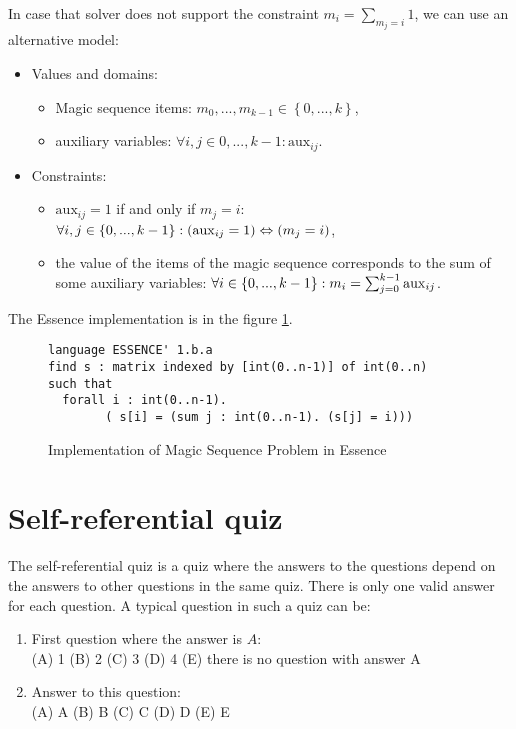 In case that solver does not support the constraint $m_i = \sum_{m_j = i}{1}$, we 
can use an alternative model: 

\begin{itemize}
	\item Values and domains:
  \begin{itemize} 
	 \item Magic sequence items: $m_0, ..., m_{k-1} \in \left\{0, ..., k\right\}$,
	 \item auxiliary variables: $\forall i,j \in {0, ..., k-1}: \mathrm{aux}_{ij}$.
	\end{itemize}
	\item Constraints:
	 \begin{itemize}
    \item $\mathrm{aux}_{ij} = 1$ if and only if $m_j = i$: $\forall i,j \in \left\{0, ..., k-1\right\}:\\ 
          (\mathrm{aux}_{ij} = 1) \Leftrightarrow (m_j = i)$,
	  \item the value of the items of the magic sequence corresponds to the sum of some auxiliary variables: 
          $\forall i \in \left\{0, ..., k-1\right\}:\\ m_i = \sum_{j=0}^{k-1}{\mathrm{aux}_{ij}}$.
    \end{itemize}
\end{itemize}
The Essence implementation is in the figure \ref{benchmark-essence:mseq}.

\begin{figure}
\caption{\label{benchmark-essence:mseq}Implementation of Magic Sequence Problem in Essence}
\begin{lstlisting}
language ESSENCE' 1.b.a
find s : matrix indexed by [int(0..n-1)] of int(0..n)
such that
  forall i : int(0..n-1).
        ( s[i] = (sum j : int(0..n-1). (s[j] = i)))
\end{lstlisting} 
\end{figure}

\section{Self-referential quiz}

The self-referential quiz is a quiz where the answers to the questions depend on the answers
to other questions in the same quiz. There is only one valid answer for each question.
A typical question in such a quiz can be: 

\begin{enumerate}
  \item First question where the answer is $A$: \\
    (A) 1 (B) 2 (C) 3 (D) 4 (E) there is no question with answer A
  \item Answer to this question: \\ 
    (A) A (B) B (C) C (D) D (E) E
\end{enumerate}

